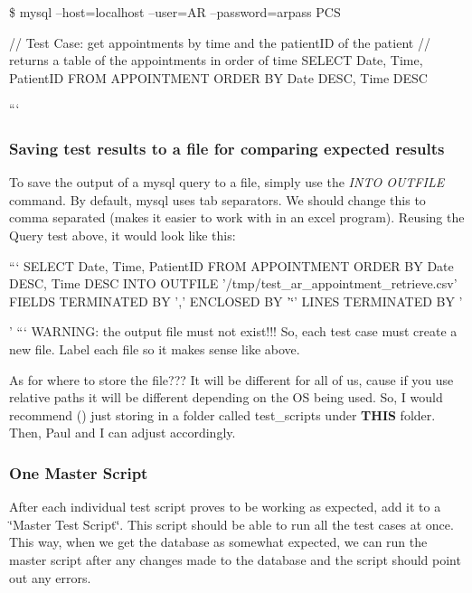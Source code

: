 \$ mysql --host=localhost --user=A\-R --password=arpass P\-C\-S

// Test Case\-: get appointments by time and the patient\-I\-D of the patient // returns a table of the appointments in order of time S\-E\-L\-E\-C\-T Date, Time, Patient\-I\-D F\-R\-O\-M A\-P\-P\-O\-I\-N\-T\-M\-E\-N\-T O\-R\-D\-E\-R B\-Y Date D\-E\-S\-C, Time D\-E\-S\-C

```

\subsubsection*{Saving test results to a file for comparing expected results}

To save the output of a mysql query to a file, simply use the {\itshape I\-N\-T\-O O\-U\-T\-F\-I\-L\-E} command. By default, mysql uses tab separators. We should change this to comma separated (makes it easier to work with in an excel program). Reusing the Query test above, it would look like this\-:

``` S\-E\-L\-E\-C\-T Date, Time, Patient\-I\-D F\-R\-O\-M A\-P\-P\-O\-I\-N\-T\-M\-E\-N\-T O\-R\-D\-E\-R B\-Y Date D\-E\-S\-C, Time D\-E\-S\-C I\-N\-T\-O O\-U\-T\-F\-I\-L\-E '/tmp/test\-\_\-ar\-\_\-appointment\-\_\-retrieve.csv' F\-I\-E\-L\-D\-S T\-E\-R\-M\-I\-N\-A\-T\-E\-D B\-Y ',' E\-N\-C\-L\-O\-S\-E\-D B\-Y '\char`\"{}' L\-I\-N\-E\-S T\-E\-R\-M\-I\-N\-A\-T\-E\-D B\-Y '\par
' ``` W\-A\-R\-N\-I\-N\-G\-: the output file must not exist!!! So, each test case must create a new file. Label each file so it makes sense like above.

As for where to store the file??? It will be different for all of us, cause if you use relative paths it will be different depending on the O\-S being used. So, I would recommend () just storing in a folder called test\-\_\-scripts under {\bfseries T\-H\-I\-S} folder. Then, Paul and I can adjust accordingly.

\subsubsection*{One Master Script}

After each individual test script proves to be working as expected, add it to a \char`\"{}\-Master Test Script\char`\"{}. This script should be able to run all the test cases at once. This way, when we get the database as somewhat expected, we can run the master script after any changes made to the database and the script should point out any errors. 

